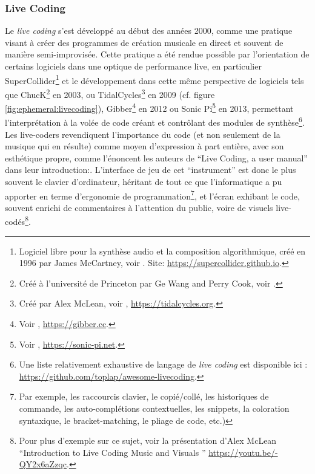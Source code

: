 \subsubsection{Live Coding}

\noindent Le \textit{live coding} s'est développé au début des années 2000, comme une pratique visant à créer des programmes de création musicale en direct et souvent de manière semi-improvisée. Cette pratique a été rendue possible par l'orientation de certains logiciels dans une optique de performance live, en particulier SuperCollider\footnote{Logiciel libre pour la synthèse audio et la composition algorithmique, créé en 1996 par James McCartney, voir \cite{mccartney_rethinking_2002}. Site: \url{https://supercollider.github.io}.} et le développement dans cette même perspective de logiciels tels que ChucK\footnote{Créé à l'université de Princeton par Ge Wang and Perry Cook, voir \cite{wang_chuck_2003}.} en 2003, ou TidalCycles\footnote{Créé par Alex McLean, voir \cite{mclean_tidalpattern_2010}, \url{https://tidalcycles.org}.} en 2009 (cf. figure \ref{fig:ephemeral:livecoding}), Gibber\footnote{Voir \cite{roberts_gibber_2012}, \url{https://gibber.cc}.} en 2012 ou Sonic Pi\footnote{Voir \cite{aaron_sonic_2013}, \url{https://sonic-pi.net}.} en 2013, permettant l'interprétation à la volée de code créant et contrôlant des modules de synthèse\footnote{Une liste relativement exhaustive de langage de \textit{live coding} est disponible ici : \url{https://github.com/toplap/awesome-livecoding}.}.\\
\indent Les live-coders revendiquent l'importance du code (et non seulement de la musique qui en résulte) comme moyen d'expression à part entière, avec son esthétique propre, comme l'énoncent les auteurs de ``Live Coding, a user manual'' dans leur introduction:. L'interface de jeu de cet ``instrument'' est donc le plus souvent le clavier d'ordinateur, héritant de tout ce que l'informatique a pu apporter en terme d'ergonomie de programmation\footnote{Par exemple, les raccourcis clavier, le copié/collé, les historiques de commande, les auto-complétions contextuelles, les snippets, la coloration syntaxique, le bracket-matching, le pliage de code, etc.)}, et l'écran exhibant le code, souvent enrichi de commentaires à l'attention du public, voire de visuels live-codés\footnote{Pour plus d'exemple sur ce sujet, voir la présentation d'Alex McLean ``Introduction to Live Coding Music and Visuals '' \url{https://youtu.be/-QY2x6aZzqc}.}.\\
